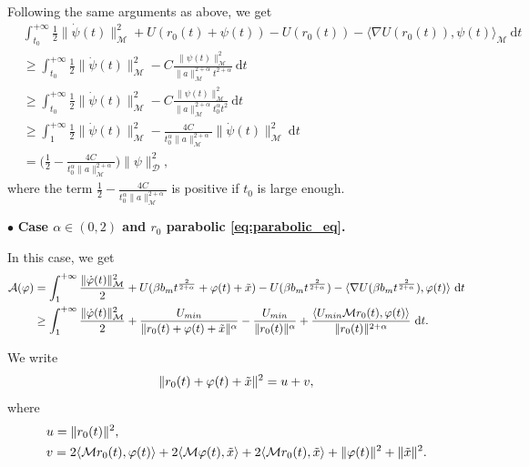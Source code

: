 \documentclass[a4paper,10pt]{amsart}
\newcommand{\ud}{\mathrm{d}}
\theoremstyle{plain}
\theoremstyle{definition}
\numberwithin{equation}{section}
\numberwithin{thm}{section}
\begin{document}
Following the same arguments as above, we get 
\[
\begin{split}
&\int_{t_0}^{+\infty}\frac{1}{2}\|\dot\psi(t)\|_\mathcal{M}^2 + U(r_0(t) + \psi(t)) - U(r_0(t))  - \langle\nabla U(r_0(t)) ,\psi(t)\rangle_\mathcal{M}\ \ud t\\
& \ge \int_{t_0}^{+\infty}\frac{1}{2}\|\dot\psi(t)\|_\mathcal{M}^2 -C\frac{\|\psi(t)\|_\mathcal{M}^2}{\|a\|_\mathcal{M}^{2+\alpha}t^{2+\alpha}}\ \ud t\\
& \ge \int_{t_0}^{+\infty}\frac{1}{2}\|\dot\psi(t)\|_\mathcal{M}^2 -C\frac{\|\psi(t)\|_\mathcal{M}^2}{\|a\|_\mathcal{M}^{2+\alpha}t_0^\alpha t^2}\ \ud t\\
& \ge \int_{1}^{+\infty}\frac{1}{2}\|\dot\psi(t)\|_\mathcal{M}^2 - \frac{4C}{t_0^\alpha\|a\|_\mathcal{M}^{2+\alpha}}\|\dot\psi(t)\|_\mathcal{M}^2\ \ud t\\
& = \bigg( \frac{1}{2} -  \frac{4C}{t_0^\alpha\|a\|_\mathcal{M}^{2+\alpha}}\bigg)\|\psi\|_\mathcal{D}^2,
\end{split}
\]
where the term $\frac{1}{2} -  \frac{4C}{t_0^\alpha\|a\|_\mathcal{M}^{2+\alpha}}$ is positive if $t_0$ is large enough.




\noindent  $\bullet$ {\bf Case $\alpha \in (0,2)$ and $r_0$ parabolic \eqref{eq:parabolic_eq}.}

In this case, we get
\begin{equation}
\label{e:A1}
\begin{split}
    \mathcal{A}(\varphi) &= \int_{1}^{+\infty} \frac{\|\dot\varphi(t)\|_{\mathcal M}^2}{2} + U(\beta b_m t^{\frac{2}{2+\alpha}}+\varphi(t)+\Tilde{x}) - U(\beta b_m t^{\frac{2}{2+\alpha}}) - \langle \nabla U(\beta b_m t^{\frac{2}{2+\alpha}}),\varphi(t)\rangle\ \ud t \\
    & \ge \int_{1}^{+\infty}\frac{\|\dot\varphi(t)\|_{\mathcal M}^2}{2}  + \frac{U_{min}}{\|r_0(t)+\varphi(t)+\Tilde{x}\|^\alpha} - \frac{U_{min}}{\|r_0(t)\|^\alpha} + \frac{\langle U_{min}\mathcal{M}r_0(t),\varphi(t)\rangle}{\|r_0(t)\|^{2+\alpha}}\ \ud t.
\end{split}
\end{equation}

We write
\begin{displaymath}
    \|r_0(t)+\varphi(t)+\Tilde{x}\|^2 = u + v,
\end{displaymath}
where
\begin{displaymath}
    \begin{split}
        & u = \|r_0(t)\|^2,\\
        & v = 2\langle \mathcal{M}r_0(t),\varphi(t)\rangle + 2\langle \mathcal{M}\varphi(t),\Tilde{x}\rangle + 2\langle \mathcal{M} r_0(t),\Tilde{x}\rangle + \|\varphi(t)\|^2 + \|\Tilde{x}\|^2.
    \end{split}
\end{displaymath}
\end{document}
